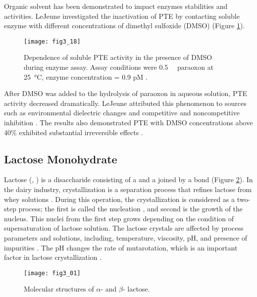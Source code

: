 \begin{refsection}
Organic solvent has been demonstrated to impact enzymes stabilities and
activities. LeJeune  investigated the inactivation of PTE by
contacting soluble enzyme with different concentrations of dimethyl sulfoxide
(DMSO) \cite{Lejeune1997a} (Figure \ref{fig:pte-organic-inactive}).
\begin{figure}[htbp] \centering \texttt{[image: fig3\_18]}
    \caption[Dependence of soluble PTE activity in the
    presence of DMSO during enzyme assay. Assay conditions were
\SI{0.5}{\milli\Molar} paraoxon at \SI{25}{\celsius}, enzyme concentration =
0.9 pM.]{Dependence of soluble PTE activity in the presence of
    DMSO during enzyme assay. Assay conditions were \SI{0.5}{\milli\Molar}
    paraoxon at \SI{25}{\celsius}, enzyme concentration = 0.9 pM
    \cite{Lejeune1997a}.}
    \label{fig:pte-organic-inactive}
\end{figure}

After DMSO was added to the hydrolysis of paraoxon in
aqueous solution, PTE activity decreased dramatically. LeJeune 
attributed this phenomenon to sources such as environmental dielectric changes
and competitive and noncompetitive inhibition \cite{Lejeune1997a}. The results
also demonstrated PTE with DMSO concentrations above 40\% exhibited substantial
irreversible effects \cite{Lejeune1997a}.

\subsection{Lactose Monohydrate}

Lactose (,
) is a disaccharide consisting of a  and a
 joined by a  bond (Figure
\ref{fig:lactose-structure}). In the dairy industry, crystallization is a
separation process that refines lactose from whey solutions
\cite{Hourigan2013}. During this operation, the crystallization is considered
as a two-step process; the first is called the nucleation
\cite{Schmitt1999,Wong2014}, and second is the growth of the nucleus.  This
nuclei from the first step grows depending on the condition of supersaturation
of lactose solution.  The lactose crystals are affected by process parameters
and solutions, including, temperature, viscosity, pH, and presence of
impurities \cite{Bhargava1996}. The pH changes the rate of mutarotation, which
is an important factor in lactose crystallization \cite{Hourigan2013}. 
\begin{figure}[h!] \centering \texttt{[image: fig3\_01]}
    \caption[Molecular structures of $\alpha$- and $\beta$- lactose.]{Molecular
    structures of $\alpha$- and $\beta$- lactose.}
    \label{fig:lactose-structure}
\end{figure}


\end{refsection}
